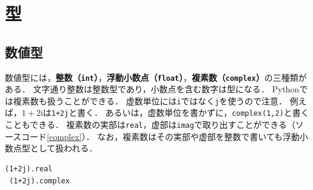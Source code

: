 \documentclass[a4paper,12pt]{jsarticle}
\begin{document}
\section{型}

\subsection{数値型}

数値型には，{\bf 整数（\texttt{int}）}，{\bf 浮動小数点（\texttt{float}）}，{\bf 複素数（\texttt{complex}）}の三種類がある．
文字通り整数は整数型であり，小数点を含む数字は型になる．
Pythonでは複素数も扱うことができる．
虚数単位には\texttt{i}ではなく\texttt{j}を使うので注意．
例えば，$1+2\mathrm{i}$は\texttt{1+2j}と書く．
あるいは，虚数単位を書かずに，\texttt{complex(1,2)}と書くこともできる．
複素数の実部は\texttt{real}，虚部は\texttt{imag}で取り出すことができる（ソースコード\ref{complex}）．
なお，複素数はその実部や虚部を整数で書いても浮動小数点型として扱われる．
\begin{lstlisting}[caption=複素数の実部，虚部を取り出す,label=complex]
 (1+2j).real
 (1+2j).complex
\end{lstlisting}
\end{document}
